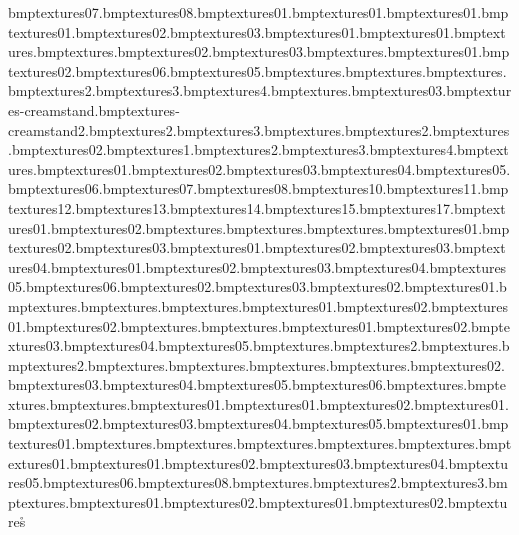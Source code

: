 bmp textures\generator07.bmp textures\generator08.bmp textures\generatorlight01.bmp textures\glass01.bmp textures\glassblue01.bmp textures\glasslogo01.bmp textures\glasslogo02.bmp textures\glasslogo03.bmp textures\glassstripe01.bmp textures\glasstriple01.bmp textures\greenlight.bmp textures\grenade.bmp textures\grenade02.bmp textures\grenade03.bmp textures\grenadepin.bmp textures\gumballpost01.bmp textures\gumballpost02.bmp textures\shopsgensign06.bmp textures\shopsgensign05.bmp textures\happymeal.bmp textures\hotdog.bmp textures\hotdogstall.bmp textures\hotdogstall2.bmp textures\hotdogstall3.bmp textures\hotdogstall4.bmp textures\hotdogwheel.bmp textures\hrydrant03.bmp textures\ice-creamstand.bmp textures\ice-creamstand2.bmp textures\iceloll2.bmp textures\iceloll3.bmp textures\icelolly.bmp textures\icewafe2.bmp textures\icewafer.bmp textures\jhutboard02.bmp textures\kite1.bmp textures\kite2.bmp textures\kite3.bmp textures\kite4.bmp textures\lace.bmp textures\leading01.bmp textures\leading02.bmp textures\leading03.bmp textures\leading04.bmp textures\leading05.bmp textures\leading06.bmp textures\leading07.bmp textures\leading08.bmp textures\leading10.bmp textures\leading11.bmp textures\leading12.bmp textures\leading13.bmp textures\leading14.bmp textures\leading15.bmp textures\leading17.bmp textures01.bmp textures02.bmp textures\light.bmp textures\lightstrip.bmp textures\littledot.bmp textures\littletv01.bmp textures\littletv02.bmp textures\littletv03.bmp textures\machineback01.bmp textures\machineback02.bmp textures\machineback03.bmp textures\machineback04.bmp textures\machinebutton01.bmp textures\machinebutton02.bmp textures\machinebutton03.bmp textures\machinebutton04.bmp textures\machinebutton05.bmp textures\machinebutton06.bmp textures\machinefront02.bmp textures\machinefront03.bmp textures\machineside02.bmp textures\machinetop01.bmp textures\maintenancedoor.bmp textures\map.bmp textures\marbstat.bmp textures\market01.bmp textures\market02.bmp textures\martcheck01.bmp textures\martcheck02.bmp textures\martmat.bmp textures\mat.bmp textures\megabomb01.bmp textures\megabomb02.bmp textures\megabomb03.bmp textures\megabomb04.bmp textures\megabomb05.bmp textures\melon.bmp textures\melon2.bmp textures\milk.bmp textures\milk2.bmp textures\noentry.bmp textures\nukebox.bmp textures\paintmanw.bmp textures\pandaface.bmp textures\papers02.bmp textures\papers03.bmp textures\papers04.bmp textures\papers05.bmp textures\papers06.bmp textures\plungerbhole.bmp textures\plungerbox.bmp textures\plungerboxacme.bmp textures\polisherchromeplastic01.bmp textures\postbox01.bmp textures\postbox02.bmp textures\posterfood01.bmp textures\posterfood02.bmp textures\posterfood03.bmp textures\posterfood04.bmp textures\posterfood05.bmp textures\postside01.bmp textures\racecar01.bmp textures\racecarchasis.bmp textures\racecarfront.bmp textures\racecarglowlight.bmp textures\racecarheadlight.bmp textures\racecarrear.bmp textures\racecarwin01.bmp textures\racetrak01.bmp textures\racetrak02.bmp textures\racetrak03.bmp textures\racetrak04.bmp textures\racetrak05.bmp textures\racetrak06.bmp textures\racetrak08.bmp textures\radio.bmp textures\radio2.bmp textures\radio3.bmp textures\redlight.bmp textures\robotarm01.bmp textures\robotarm02.bmp textures\robotbolt01.bmp textures\robotbolt02.bmp textures\r